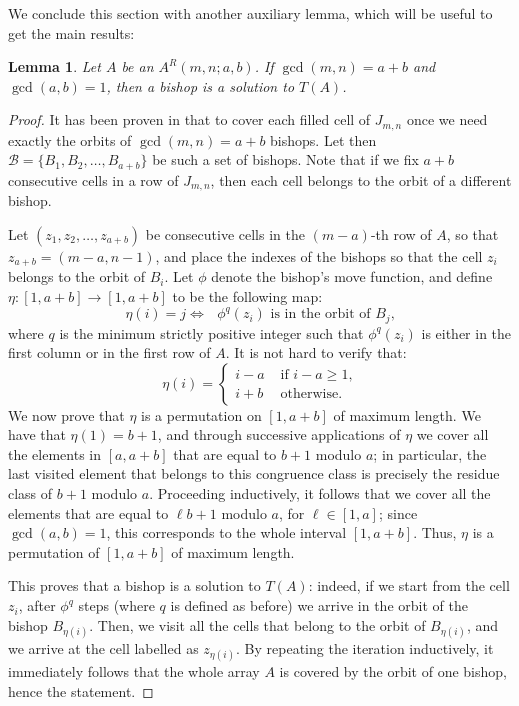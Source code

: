 \documentclass{amsart}
\newtheorem{lem}[prop]{Lemma}
\theoremstyle{definition}
\numberwithin{equation}{section}
\begin{document}
We conclude this section with another auxiliary lemma, which will be useful to get the main results:
\begin{lem} \label{lem:bishop_tour}
Let $A$ be an $A^R(m,n;a,b)$. If $\gcd(m,n) = a+b$ and $\gcd(a,b) = 1$, then a bishop is a solution to $T(A)$. 
\end{lem}
\begin{proof}
It has been proven in \cite{DF} that to cover each filled cell of $J_{m,n}$ once we need exactly the orbits of $\gcd(m,n) = a+b$ bishops.
Let then $\mathcal{B}= \{B_1, B_2,\dotsc,B_{a+b}\}$ be such a set of bishops. Note that if we fix $a+b$ consecutive cells in a row of $J_{m,n}$, then each cell belongs to the orbit of a different bishop. 

Let $(z_1, z_2,\dotsc, z_{a+b})$ be consecutive cells in the $(m-a)$-th row of $A$, so that $z_{a+b} = (m-a,n-1)$, and place the indexes of the bishops so that the cell $z_i$ belongs to the orbit of $B_i$. Let $\phi$ denote the bishop's move function, and define $\eta: [1,a+b] \rightarrow [1,a+b]$ to be the following map:
\[
 \eta(i) = j \Leftrightarrow \text{  $\phi^q(z_i)$ is in the orbit of $B_j$,}
\]
where $q$ is the minimum strictly positive integer such that $\phi^q(z_i)$ is either in the first column or in the first row of $A$.
It is not hard to verify that:
\[
\eta(i) = \left\{
\begin{aligned}
	i-a	& \text{ if $i-a\geq 1$,} \\
	i+b	& \text{ otherwise.}
\end{aligned}
\right.
\]
We now prove that $\eta$ is a permutation on $[1,a+b]$ of maximum length. We have that $\eta(1)=b+1$, and through successive applications of $\eta$ we cover all the elements in $[a,a+b]$ that are equal to $b+1$ modulo $a$; in particular, the last visited element that belongs to this congruence class is precisely  the residue class of $b+1 $ modulo $a$. Proceeding inductively, it follows that we cover all the elements that are equal to $\ell b+1$ modulo $a$, for $\ell \in[1,a]$; since $\gcd(a,b)=1$, this corresponds to the whole interval $[1,a+b]$. Thus, $\eta$ is a permutation of $[1,a+b]$ of maximum length.

This proves that a bishop is a solution to $T(A)$: indeed, if we start from the cell $z_i$, after $\phi^q$ steps (where $q$ is defined as before) we arrive in the orbit of the bishop $B_{\eta(i)}$. Then, we visit all the cells that belong to the orbit of $B_{\eta(i)}$, and we arrive at the cell labelled as $z_{\eta(i)}$. By repeating the iteration inductively, it immediately follows that the whole array $A$ is covered by the orbit of one bishop, hence the statement.
\end{proof}
\end{document}

